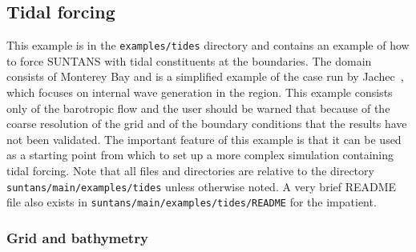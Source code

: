 \subsection{Tidal forcing} \label{sec:tidalforcing}

This example is in the \verb+examples/tides+ directory and contains an example of how
to force SUNTANS with tidal constituents at the boundaries.  The domain consists of
Monterey Bay and is a simplified example of the case run by Jachec\etal~\cite{JACHEC[2006]},
which focuses on internal wave generation in the region.  This example consists only of the
barotropic flow and the user should be warned that because of the coarse resolution of the
grid and of the boundary conditions that the results have not been validated.  The important feature of
this example is that it can be used as a starting point from which to set up a more
complex simulation containing tidal forcing.  Note that all files and directories are relative
to the directory \verb+suntans/main/examples/tides+ unless otherwise noted.  A very brief
README file also exists in \verb+suntans/main/examples/tides/README+ for the impatient.

\subsubsection{Grid and bathymetry}

